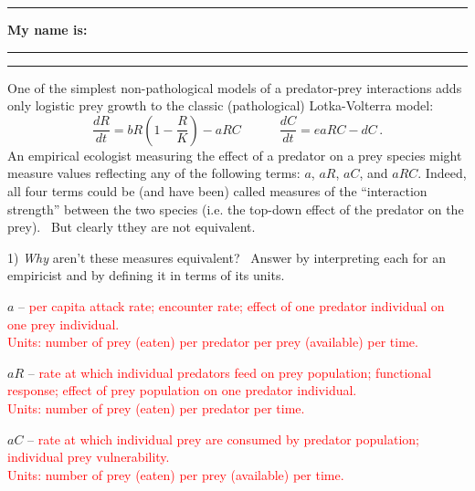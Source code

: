 \documentclass{article}
\newcommand*{\blanks}[1][4em]{\rule{#1}{.4pt}}
\begin{document}
\noindent{}

\rule[0.5ex]{\linewidth}{1pt}
\begin{center}
	\textbf{My name is:} \blanks[150pt]
\end{center}
\rule[0.5ex]{\linewidth}{1pt}

One of the simplest non-pathological models of a predator-prey interactions adds only logistic prey growth to the classic (pathological) Lotka-Volterra model:
\begin{equation*}
	\frac{dR}{dt} = b R \left ( 1 - \frac{R}{K} \right ) - a R C 
	\quad \quad \quad
	\frac{dC}{dt} = e a R C - d C \, .	
\end{equation*}
An empirical ecologist measuring the effect of a predator on a prey species might measure values reflecting any of the following terms: $a$, $a R$, $a C$, and $aRC$.  Indeed, all four terms could be (and have been) called measures of the ``interaction strength'' between the two species (i.e. the top-down effect of the predator on the prey).  But clearly tthey are not equivalent.


1) \textit{Why} aren't these measures equivalent?  Answer by interpreting each  for an empiricist and by defining it in terms of its units.

\vspace{0.1 cm}

$a$ -- 
	\textcolor{red}{
		per capita attack rate; encounter rate; effect of one predator individual on one prey individual.\\
		Units: number of prey (eaten) per predator per prey (available) per time.
	}
	\vspace{0.1 cm}

$aR$ --
	\textcolor{red}{
		rate at which individual predators feed on prey population; functional response; effect of prey population on one predator individual.\\
		Units: number of prey (eaten) per predator per time.
}
\vspace{0.1 cm}

$aC$ --
	\textcolor{red}{
		rate at which individual prey are consumed by predator population; individual prey vulnerability.\\
		Units: number of prey (eaten) per prey (available) per time.
}
\vspace{0.1 cm}
\end{document}
